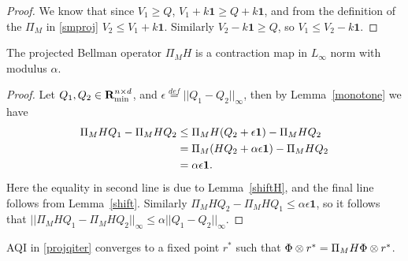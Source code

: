 \begin{proof}
We know that since $V_1\geq Q$, $V_1+k\mathbf{1}\geq Q+k\mathbf{1}$, and from the definition of the $\Pi_M$ in \eqref{smproj} $V_2\leq V_1+k\mathbf{1}$. Similarly $V_2-k\mathbf{1}\geq Q$, so $V_1\leq V_2-k\mathbf{1}$.
\end{proof}
\begin{theorem}\label{contra}
The projected Bellman operator $\Pi_M H$ is a contraction map in $L_\infty$ norm with modulus $\alpha$.
\end{theorem}
\begin{proof}
Let $Q_1,Q_2\in\mathbf{R}_{\min}^{n\times d}$, and $\epsilon\stackrel{def}{=}||Q_1-Q_2||_\infty$, then by Lemma~\ref{monotone} we have
\begin{align}
\Pi_M H Q_1- \Pi_M HQ_2&\leq \Pi_M H (Q_2+\epsilon\mathbf{1})-\Pi_M HQ_2\nonumber\\
				&=\Pi_M (H Q_2 +\alpha\epsilon\mathbf{1})-\Pi_M HQ_2\nonumber\\
				&=\alpha\epsilon\mathbf{1}.
\end{align}
Here the equality in second line is due to Lemma~\ref{shiftH}, and the final line follows from Lemma~\ref{shift}. Similarly $\Pi_M H Q_2- \Pi_M HQ_1\leq \alpha\epsilon\mathbf{1}$, so it follows that $||\Pi_M HQ_1-\Pi_MHQ_2||_\infty\leq \alpha ||Q_1-Q_2||_\infty$.
\end{proof}
\begin{corollary}\label{minpaviconv}
AQI in \eqref{projqiter} converges to a fixed point $r^*$ such that $\Phi \otimes r^*=\Pi_M H \Phi \otimes r^*$.
\end{corollary}
